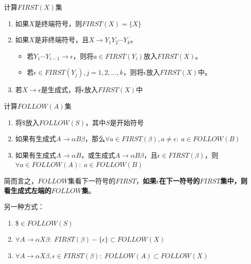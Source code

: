 \begin{myalgorithm}
计算$FIRST(X)$集
\begin{enumerate}
	\item 如果$X$是终端符号，则$FIRST(X)=\{X\}$
	\item 如果$X$是非终端符号，且$X\to Y_1Y_2\cdots Y_k$。
\begin{itemize}
	\item 若$Y_1\cdots Y_{i-1}\to\epsilon$，则将$a\in FIRST(Y_i)$放入$FIRST(X)$。
	\item 若$\epsilon\in FIRST(Y_j),j=1,2,\ldots,k$，则将$\epsilon$放入$FIRST(X)$中。
\end{itemize}
	\item 若$X\to\epsilon$是生成式，将$\epsilon$放入$FIRST(X)$中
\end{enumerate}
\end{myalgorithm}

\begin{myalgorithm}
计算$FOLLOW(A)$集
\begin{enumerate}
	\item 将$\$$放入$FOLLOW(S)$，其中$S$是开始符号
	\item 如果有生成式$A\to\alpha B\beta$，那么$\forall a\in FIRST(\beta),a \ne\epsilon:\;a\in FOLLOW(B)$
	\item 如果有生成式$A\to\alpha B$，或生成式$A\to\alpha B\beta$，且$\epsilon\in FIRST(\beta)$，则$\forall a\in FOLLOW(A):\;a\in FOLLOW(B)$
\end{enumerate}
\end{myalgorithm}

简而言之，$FOLLOW$集看下一符号的$FIRST$，\textbf{如果$\epsilon$在下一符号的$FIRST$集中，则看生成式左端的$FOLLOW$集}。

另一种方式：
\begin{enumerate}
	\item \$$\in FOLLOW(S)$
	\item $\forall A\to\alpha X\beta:\;FIRST(\beta)-\{\epsilon\}\subset FOLLOW(X)$
	\item $\forall A\to\alpha X\beta,\epsilon\in FIRST(\beta):\;FOLLOW(A)\subset FOLLOW(X)$
\end{enumerate}

